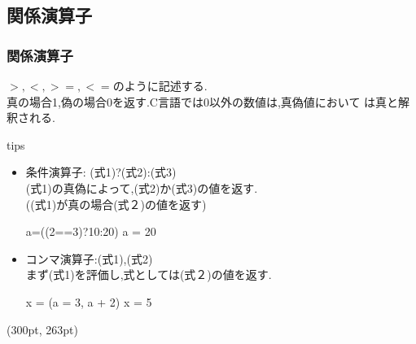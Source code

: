 \documentclass[dvipdfmx]{beamer}
\begin{document}
\subsection{関係演算子}
\begin{frame}[t, fragile]
    \frametitle{関係演算子}
    $>,<,>=,<=$のように記述する.\\
    真の場合1,偽の場合0を返す.\textrm{C}言語では0以外の数値は,真偽値において
    は真と解釈される.
    \begin{itembox}[l]{tips}
        \begin{itemize}
            \item 条件演算子: (式1)?(式2):(式3)\\
                (式1)の真偽によって,(式2)か(式3)の値を返す.\\
                ((式1)が真の場合(式２)の値を返す)
                \begin{block}{a=((2==3)?10:20)}
                    a = 20
                \end{block}
            \item コンマ演算子:(式1),(式2)\\
                まず(式1)を評価し,式としては(式２)の値を返す.
                \begin{block}{x = (a = 3, a + 2)}
                    x = 5
                \end{block}
        \end{itemize}
    \end{itembox}
    \begin{textblock*}{0.3\linewidth}(300pt, 263pt)
    \space
    \end{textblock*}
\end{frame}
\end{document}
